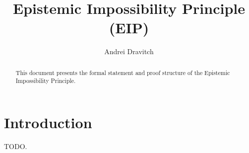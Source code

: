\documentclass{article}
\title{Epistemic Impossibility Principle (EIP)}
\author{Andrei Dravitch}
\date{}
\begin{document}
\maketitle

\begin{abstract}
This document presents the formal statement and proof structure of the Epistemic Impossibility Principle.
\end{abstract}

\section{Introduction}
TODO.



\end{document}
